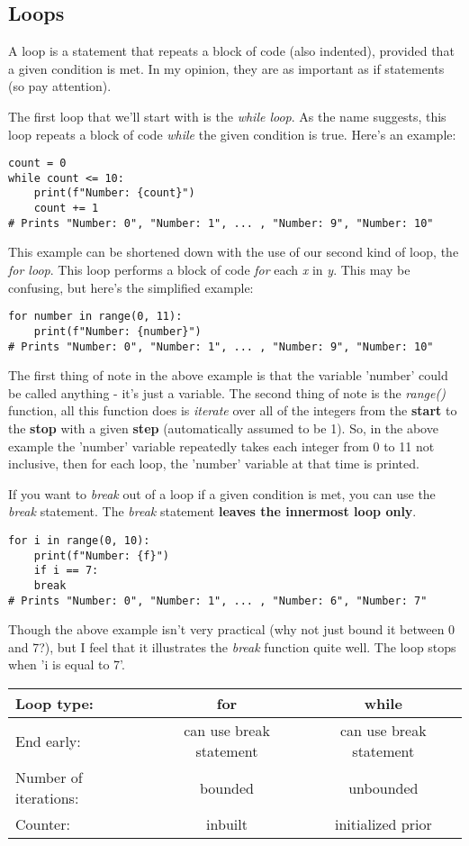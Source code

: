 \documentclass{article}
\begin{document}
\subsection{Loops}
A loop is a statement that repeats a block of code (also indented), provided that a given condition is met. In my opinion, they are as important as if statements (so pay attention). \medskip

The first loop that we'll start with is the \textit{while loop}. As the name suggests, this loop repeats a block of code \textit{while} the given condition is true. Here's an example:

\begin{verbatim}
count = 0
while count <= 10:
    print(f"Number: {count}")
    count += 1
# Prints "Number: 0", "Number: 1", ... , "Number: 9", "Number: 10"
\end{verbatim}

This example can be shortened down with the use of our second kind of loop, the \textit{for loop}. This loop performs a block of code \textit{for} each \textit{x} in \textit{y}. This may be confusing, but here's the simplified example:

\begin{verbatim}
for number in range(0, 11):
    print(f"Number: {number}")
# Prints "Number: 0", "Number: 1", ... , "Number: 9", "Number: 10"
\end{verbatim}

The first thing of note in the above example is that the variable 'number' could be called anything - it's just a variable. The second thing of note is the \textit{range()} function, all this function does is \textit{iterate} over all of the integers from the \textbf{start} to the \textbf{stop} with a given \textbf{step} (automatically assumed to be 1). So, in the above example the 'number' variable repeatedly takes each integer from 0 to 11 not inclusive, then for each loop, the 'number' variable at that time is printed. \medskip

If you want to \textit{break} out of a loop if a given condition is met, you can use the \textit{break} statement. The \textit{break} statement \textbf{leaves the innermost loop only}.

\begin{verbatim}
for i in range(0, 10):
    print(f"Number: {f}")
    if i == 7:
	break
# Prints "Number: 0", "Number: 1", ... , "Number: 6", "Number: 7"
\end{verbatim}

Though the above example isn't very practical (why not just bound it between 0 and 7?), but I feel that it illustrates the \textit{break} function quite well. The loop stops when 'i is equal to 7'. \medskip

\begin{center}
\begin{tabular}{l|c|c}
	Loop type: & \textbf{for} & \textbf{while} \\
	\hline
	End early: & can use break statement & can use break statement \\
	Number of iterations: & bounded & unbounded \\
	Counter: & inbuilt & initialized prior
\end{tabular}
\end{center}
\end{document}
